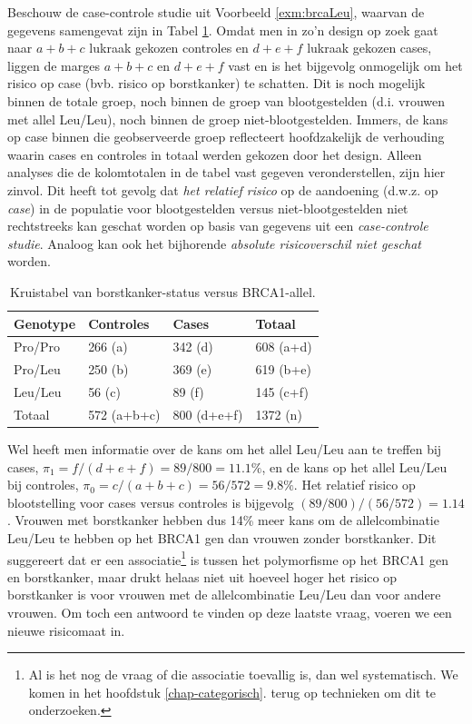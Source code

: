\documentclass[
  12pt,dutch]{book}
\theoremstyle{definition}
\theoremstyle{definition}
\theoremstyle{definition}
\theoremstyle{definition}
\theoremstyle{remark}
\begin{document}
Beschouw de case-controle studie uit Voorbeeld \ref{exm:brcaLeu}, waarvan
de gegevens samengevat zijn in Tabel \ref{tab:leu2}. Omdat men in
zo'n design op zoek gaat naar \(a+b+c\) lukraak gekozen controles en \(d+e+f\) lukraak
gekozen cases, liggen de marges \(a+b+c\) en \(d+e+f\) vast en is het bijgevolg
onmogelijk om het risico op case (bvb. risico op borstkanker) te schatten. Dit is noch mogelijk binnen de
totale groep, noch binnen de groep van blootgestelden (d.i. vrouwen met allel Leu/Leu), noch binnen de groep
niet-blootgestelden. Immers, de kans op case binnen die geobserveerde groep reflecteert hoofdzakelijk de verhouding waarin cases en controles in totaal werden gekozen door het design. Alleen analyses die de kolomtotalen
in de tabel vast gegeven veronderstellen, zijn hier zinvol. Dit heeft tot
gevolg dat \emph{het relatief risico} op de aandoening (d.w.z. op \emph{case})
in de populatie voor blootgestelden versus niet-blootgestelden niet
rechtstreeks kan geschat worden op basis van gegevens uit een \emph{case-controle studie}. Analoog kan ook het bijhorende \emph{absolute risicoverschil niet geschat} worden.

\begin{table}

\caption{\label{tab:leu2}Kruistabel van borstkanker-status versus BRCA1-allel.}
\centering
\begin{tabular}[t]{llll}
\toprule
Genotype & Controles & Cases & Totaal\\
\midrule
Pro/Pro & 266 (a) & 342 (d) & 608 (a+d)\\
Pro/Leu & 250 (b) & 369 (e) & 619 (b+e)\\
Leu/Leu & 56 (c) & 89 (f) & 145 (c+f)\\
Totaal & 572 (a+b+c) & 800 (d+e+f) & 1372 (n)\\
\bottomrule
\end{tabular}
\end{table}

Wel heeft men informatie over de kans om het allel Leu/Leu aan te treffen bij cases, \(\pi_1=f/(d+e+f)=89/800=11.1\%\), en de kans op het allel Leu/Leu bij controles, \(\pi_0=c/(a+b+c)=56/572=9.8\%\). Het relatief risico op blootstelling voor cases versus
controles is bijgevolg \((89/800)/(56/572)=1.14\). Vrouwen met borstkanker hebben dus
14\% meer kans om de allelcombinatie Leu/Leu te hebben op het BRCA1 gen dan vrouwen zonder borstkanker.
Dit suggereert dat er
een associatie\footnote{Al is het nog de vraag of die associatie toevallig is, dan wel systematisch. We komen in het hoofdstuk \ref{chap-categorisch}. terug op technieken om dit te onderzoeken.} is tussen het polymorfisme op het BRCA1 gen en borstkanker, maar drukt helaas niet uit hoeveel hoger het risico op borstkanker is voor vrouwen met de allelcombinatie Leu/Leu dan voor andere vrouwen. Om toch een antwoord te vinden op deze laatste vraag, voeren we een nieuwe risicomaat in.
\end{document}
